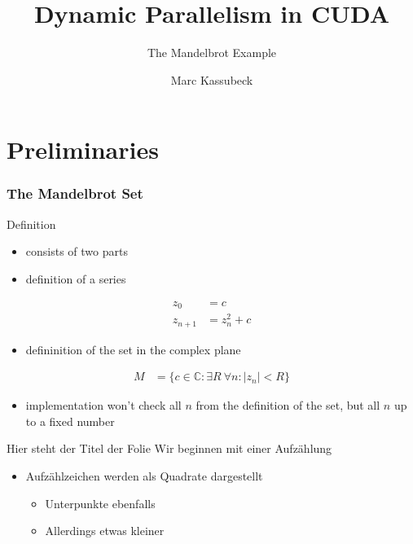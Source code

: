 \documentclass[fleqn,11pt,aspectratio=43]{beamer}
\title{Dynamic Parallelism in CUDA}
\subtitle{The Mandelbrot Example}
\author{Marc Kassubeck}
\begin{document}
\begin{frame}[plain]
\titlepage
\end{frame}

\part{Preliminaries}

\begin{frame}[plain]
  \partpage
\end{frame}


\section{The Mandelbrot Set}

\begin{frame}{Definition}
	\begin{itemize}
		\item consists of two parts
		\item definition of a series
	\end{itemize}	
	\begin{align*}
		z_0 &= c\\
		z_{n+1} &= z_n^2 + c
	\end{align*}
	\begin{itemize}
		\item defininition of the set in the complex plane
	\end{itemize}
	\begin{align*}
		M &= \{c \in \mathbb{C}: \exists R\ \forall n: \left| z_n \right| < R \}
	\end{align*}
	\begin{itemize}
		\item implementation won't check all $n$ from the definition of the set, but all $n$ up to a fixed number
	\end{itemize}
\end{frame}

\begin{frame}{Hier steht der Titel der Folie}
Wir beginnen mit einer Aufzählung
\begin{itemize}
  \item Aufzählzeichen werden als Quadrate dargestellt
  \begin{itemize}
    \item Unterpunkte ebenfalls
    \item Allerdings etwas kleiner
  \end{itemize}
\end{itemize}
\end{frame}
\end{document}
